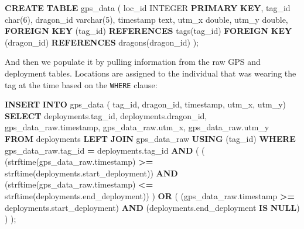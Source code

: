 \documentclass[
]{book}
\newenvironment{Shaded}{\begin{snugshade}}{\end{snugshade}}
\newcommand{\DataTypeTok}[1]{\textcolor[rgb]{0.13,0.29,0.53}{#1}}
\newcommand{\DecValTok}[1]{\textcolor[rgb]{0.00,0.00,0.81}{#1}}
\newcommand{\KeywordTok}[1]{\textcolor[rgb]{0.13,0.29,0.53}{\textbf{#1}}}
\newcommand{\NormalTok}[1]{#1}
\newcommand{\OperatorTok}[1]{\textcolor[rgb]{0.81,0.36,0.00}{\textbf{#1}}}
\begin{document}
\begin{Shaded}
\begin{Highlighting}[]

\KeywordTok{CREATE} \KeywordTok{TABLE}\NormalTok{ gps\_data (}
\NormalTok{loc\_id }\DataTypeTok{INTEGER} \KeywordTok{PRIMARY} \KeywordTok{KEY}\NormalTok{,}
\NormalTok{tag\_id }\DataTypeTok{char}\NormalTok{(}\DecValTok{6}\NormalTok{),}
\NormalTok{dragon\_id }\DataTypeTok{varchar}\NormalTok{(}\DecValTok{5}\NormalTok{),}
\DataTypeTok{timestamp}\NormalTok{ text,}
\NormalTok{utm\_x }\DataTypeTok{double}\NormalTok{,}
\NormalTok{utm\_y }\DataTypeTok{double}\NormalTok{,}
\KeywordTok{FOREIGN} \KeywordTok{KEY}\NormalTok{ (tag\_id) }\KeywordTok{REFERENCES}\NormalTok{ tags(tag\_id)}
\KeywordTok{FOREIGN} \KeywordTok{KEY}\NormalTok{ (dragon\_id) }\KeywordTok{REFERENCES}\NormalTok{ dragons(dragon\_id)}
\NormalTok{);}
\end{Highlighting}
\end{Shaded}

And then we populate it by pulling information from the raw GPS and deployment
tables. Locations are assigned to the individual that was wearing the tag at the
time based on the \texttt{WHERE} clause:

\begin{Shaded}
\begin{Highlighting}[]
\KeywordTok{INSERT} \KeywordTok{INTO}\NormalTok{ gps\_data (}
\NormalTok{tag\_id, dragon\_id, }\DataTypeTok{timestamp}\NormalTok{, utm\_x, utm\_y)}
\KeywordTok{SELECT}
\NormalTok{deployments.tag\_id,}
\NormalTok{deployments.dragon\_id,}
\NormalTok{gps\_data\_raw.}\DataTypeTok{timestamp}\NormalTok{,}
\NormalTok{gps\_data\_raw.utm\_x,}
\NormalTok{gps\_data\_raw.utm\_y}
\KeywordTok{FROM}\NormalTok{ deployments }\KeywordTok{LEFT} \KeywordTok{JOIN}\NormalTok{ gps\_data\_raw }\KeywordTok{USING}\NormalTok{ (tag\_id)}
\KeywordTok{WHERE}\NormalTok{ gps\_data\_raw.tag\_id }\OperatorTok{=}\NormalTok{ deployments.tag\_id }\KeywordTok{AND}
\NormalTok{(}
\NormalTok{    (}
\NormalTok{    (strftime(gps\_data\_raw.}\DataTypeTok{timestamp}\NormalTok{) }\OperatorTok{\textgreater{}=}\NormalTok{ strftime(deployments.start\_deployment)) }\KeywordTok{AND}
\NormalTok{    (strftime(gps\_data\_raw.}\DataTypeTok{timestamp}\NormalTok{) }\OperatorTok{\textless{}=}\NormalTok{ strftime(deployments.end\_deployment))}
\NormalTok{    )}
\KeywordTok{OR} 
\NormalTok{    (}
\NormalTok{    (gps\_data\_raw.}\DataTypeTok{timestamp} \OperatorTok{\textgreater{}=}\NormalTok{ deployments.start\_deployment) }\KeywordTok{AND}
\NormalTok{    (deployments.end\_deployment }\KeywordTok{IS} \KeywordTok{NULL}\NormalTok{)}
\NormalTok{    )}
\NormalTok{);}
\end{Highlighting}
\end{Shaded}
\end{document}

